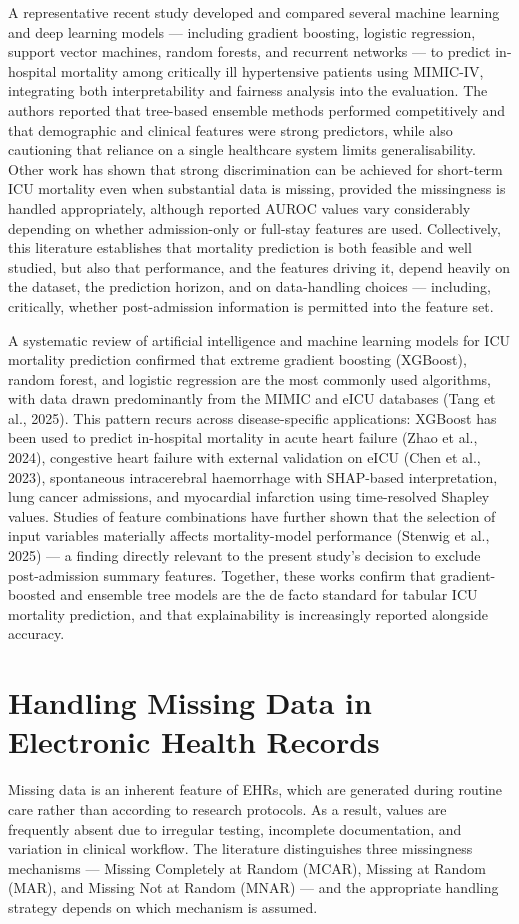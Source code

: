 \documentclass[12pt,a4paper]{report}
\begin{document}
A representative recent study developed and compared several machine learning and deep learning models --- including gradient boosting, logistic regression, support vector machines, random forests, and recurrent networks --- to predict in-hospital mortality among critically ill hypertensive patients using MIMIC-IV, integrating both interpretability and fairness analysis into the evaluation. The authors reported that tree-based ensemble methods performed competitively and that demographic and clinical features were strong predictors, while also cautioning that reliance on a single healthcare system limits generalisability. Other work has shown that strong discrimination can be achieved for short-term ICU mortality even when substantial data is missing, provided the missingness is handled appropriately, although reported AUROC values vary considerably depending on whether admission-only or full-stay features are used. Collectively, this literature establishes that mortality prediction is both feasible and well studied, but also that performance, and the features driving it, depend heavily on the dataset, the prediction horizon, and on data-handling choices --- including, critically, whether post-admission information is permitted into the feature set.

A systematic review of artificial intelligence and machine learning models for ICU mortality prediction confirmed that extreme gradient boosting (XGBoost), random forest, and logistic regression are the most commonly used algorithms, with data drawn predominantly from the MIMIC and eICU databases (Tang et al., 2025). This pattern recurs across disease-specific applications: XGBoost has been used to predict in-hospital mortality in acute heart failure (Zhao et al., 2024), congestive heart failure with external validation on eICU (Chen et al., 2023), spontaneous intracerebral haemorrhage with SHAP-based interpretation, lung cancer admissions, and myocardial infarction using time-resolved Shapley values. Studies of feature combinations have further shown that the selection of input variables materially affects mortality-model performance (Stenwig et al., 2025) --- a finding directly relevant to the present study's decision to exclude post-admission summary features. Together, these works confirm that gradient-boosted and ensemble tree models are the de facto standard for tabular ICU mortality prediction, and that explainability is increasingly reported alongside accuracy.


\section{Handling Missing Data in Electronic Health Records}
Missing data is an inherent feature of EHRs, which are generated during routine care rather than according to research protocols. As a result, values are frequently absent due to irregular testing, incomplete documentation, and variation in clinical workflow. The literature distinguishes three missingness mechanisms --- Missing Completely at Random (MCAR), Missing at Random (MAR), and Missing Not at Random (MNAR) --- and the appropriate handling strategy depends on which mechanism is assumed.
\end{document}
